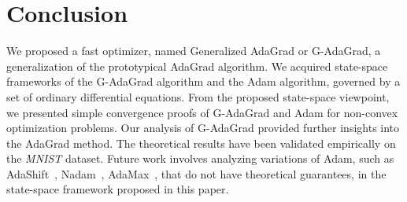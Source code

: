 \section{Conclusion}

We proposed a fast optimizer, named Generalized AdaGrad or G-AdaGrad, a generalization of the prototypical AdaGrad algorithm. 
We acquired state-space frameworks of the G-AdaGrad algorithm and the Adam algorithm, governed by a set of ordinary differential equations. From the proposed state-space viewpoint, we presented simple convergence proofs of G-AdaGrad and Adam for non-convex optimization problems. Our analysis of G-AdaGrad provided further insights into the AdaGrad method. The theoretical results have been validated empirically on the \textit{MNIST} dataset. Future work involves analyzing variations of Adam, such as AdaShift~\cite{zhou2018adashift}, Nadam~\cite{dozat2016incorporating}, AdaMax~\cite{kingma2014adam}, that do not have theoretical guarantees, in the state-space framework proposed in this paper.